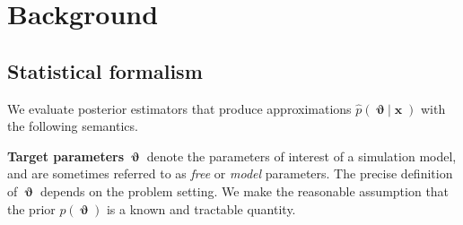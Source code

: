 \documentclass[twoside]{article}
\newcommand{\gilles}[1]{\textcolor{orange}{GL: #1}}
\newcommand{\arnaud}[1]{\textcolor{blue}{AD: #1}}
\DeclareMathOperator{\vtheta}{\boldsymbol\vartheta}
\DeclareMathOperator{\vx}{\boldsymbol x}
\begin{document}

\section{Background}
\label{sec:background}

\subsection{Statistical formalism}
\label{sec:statistical_formalism}
We evaluate posterior estimators that produce approximations $\hat{p}(\vtheta\vert\vx)$ with the following semantics.

{\bf Target parameters} $\vtheta$ denote the parameters of interest of a simulation model, and are sometimes referred to as \emph{free} or \emph{model} parameters. The precise definition of $\vtheta$ depends on the problem setting. We make the reasonable assumption that the prior $p(\vtheta)$ is a known and tractable quantity.
\end{document}

